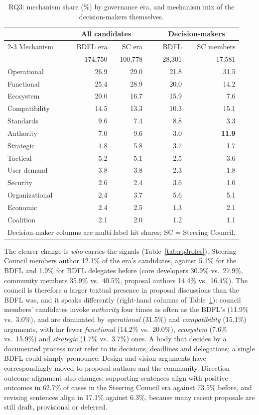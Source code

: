 \documentclass[sigconf,screen]{acmart}
\begin{document}
\begin{table}[t]
\caption{RQ3: mechanism share (\%) by governance era, and mechanism mix of the decision-makers themselves.}
\label{tab:rq3}
\begin{tabular}{lrrcrr}
\toprule
 & \multicolumn{2}{c}{All candidates} & & \multicolumn{2}{c}{Decision-makers} \\
\cmidrule{2-3}\cmidrule{5-6}
Mechanism & BDFL era & SC era & & BDFL & SC members \\
 & 174,750 & 100,778 & & 28,301 & 17,581 \\
\midrule
Operational & 26.9 & 29.0 & & 21.8 & 31.5 \\
Functional & 25.4 & 28.9 & & 20.0 & 14.2 \\
Ecosystem & 20.0 & 16.7 & & 15.9 & 7.6 \\
Compatibility & 14.5 & 13.3 & & 10.3 & 15.1 \\
Standards & 9.6 & 7.4 & & 8.8 & 3.3 \\
Authority & 7.0 & 9.6 & & 3.0 & \textbf{11.9} \\
Strategic & 4.8 & 5.8 & & 3.7 & 1.7 \\
Tactical & 5.2 & 5.1 & & 2.5 & 3.6 \\
User demand & 3.8 & 3.8 & & 2.3 & 1.8 \\
Security & 2.6 & 2.4 & & 3.6 & 1.0 \\
Organizational & 2.4 & 3.7 & & 5.6 & 5.1 \\
Economic & 2.4 & 2.5 & & 1.3 & 2.1 \\
Coalition & 2.1 & 2.0 & & 1.2 & 1.1 \\
\bottomrule
\multicolumn{6}{l}{\footnotesize Decision-maker columns are multi-label hit shares; SC = Steering Council.}
\end{tabular}
\end{table}

The clearer change is \emph{who} carries the signals (Table~\ref{tab:rq3roles}). Steering Council members author 12.1\% of the era's candidates, against 5.1\% for the BDFL and 1.9\% for BDFL delegates before (core developers 30.9\% vs.\ 27.9\%, community members 35.9\% vs.\ 40.5\%, proposal authors 14.4\% vs.\ 16.4\%). The council is therefore a larger textual presence in proposal discussions than the BDFL was, and it speaks differently (right-hand columns of Table~\ref{tab:rq3}): council members' candidates invoke \emph{authority} four times as often as the BDFL's (11.9\% vs.\ 3.0\%), and are dominated by \emph{operational} (31.5\%) and \emph{compatibility} (15.1\%) arguments, with far fewer \emph{functional} (14.2\% vs.\ 20.0\%), \emph{ecosystem} (7.6\% vs.\ 15.9\%) and \emph{strategic} (1.7\% vs.\ 3.7\%) ones. A body that decides by a documented process must refer to its decisions, deadlines and delegations; a single BDFL could simply pronounce. Design and vision arguments have correspondingly moved to proposal authors and the community. Direction--outcome alignment also changes: supporting sentences align with positive outcomes in 62.7\% of cases in the Steering Council era against 73.5\% before, and revising sentences align in 17.1\% against 6.3\%, because many recent proposals are still draft, provisional or deferred.
\end{document}

